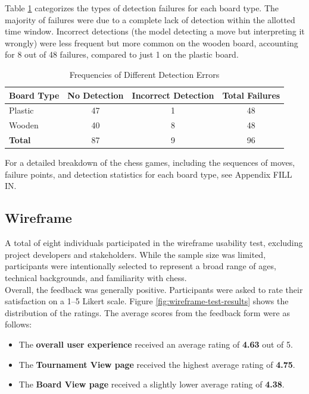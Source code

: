 Table \ref{tab:different-errors} categorizes the types of detection failures for each board type. The majority of failures were due to a complete lack of detection within the allotted time window. Incorrect detections (the model detecting a move but interpreting it wrongly) were less frequent but more common on the wooden board, accounting for 8 out of 48 failures, compared to just 1 on the plastic board.  \\

\begin{table}[htbp]
\centering
\caption[Different detection errors]{Frequencies of Different Detection Errors}
\label{tab:different-errors}
\begin{tabular}{lccc}
\toprule
\textbf{Board Type} & \textbf{No Detection} & \textbf{Incorrect Detection} & \textbf{Total Failures} \\
\midrule
Plastic & 47 & 1 & 48 \\
Wooden & 40 & 8 & 48 \\
\midrule
\textbf{Total} & 87 & 9 & 96 \\
\bottomrule
\end{tabular}
\end{table}

For a detailed breakdown of the chess games, including the sequences of moves, failure points, and detection statistics for each board type, see Appendix FILL IN.

\subsection{Wireframe}
\label{subsec:wireframe-results}

A total of eight individuals participated in the wireframe usability test, excluding project developers and stakeholders. While the sample size was limited, participants were intentionally selected to represent a broad range of ages, technical backgrounds, and familiarity with chess. \\

Overall, the feedback was generally positive. Participants were asked to rate their satisfaction on a 1–5 Likert scale. Figure \ref{fig:wireframe-test-results} shows the distribution of the ratings. The average scores from the feedback form were as follows:

\begin{itemize}
    \item The \textbf{overall user experience} received an average rating of \textbf{4.63} out of 5.
    \item The \textbf{Tournament View page} received the highest average rating of \textbf{4.75}.
    \item The \textbf{Board View page} received a slightly lower average rating of \textbf{4.38}.
\end{itemize}


